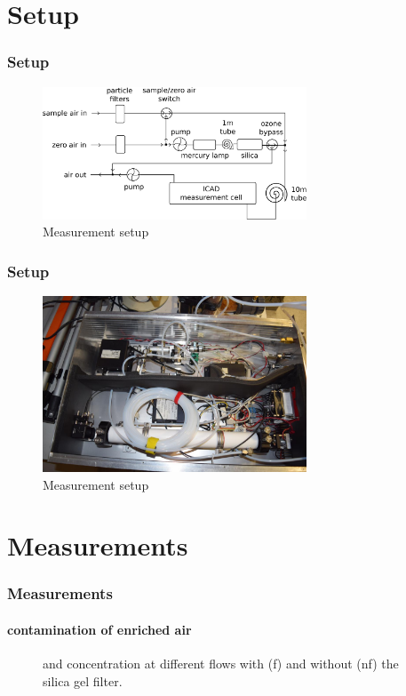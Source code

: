\documentclass[english]{beamer}
\begin{document}
\section{Setup}

\begin{frame}
  \frametitle{Setup}
  \begin{figure}[htbp]
    \centering
    \includegraphics[width=0.7\textwidth]{images/envimes_setup.eps}
    \caption{Measurement setup}
    \label{fig:setup}
  \end{figure}
\end{frame}

\begin{frame}
  \frametitle{Setup}
  \begin{figure}[htbp]
    \centering
    \includegraphics[width=0.7\textwidth]{images/envimes_up.jpg}
    \caption{Measurement setup}
    \label{fig:setup}
  \end{figure}
\end{frame}


\section{Measurements}

\begin{frame}
  \frametitle{Measurements}
  \framesubtitle{ contamination of  enriched air}
  \begin{figure}[htbp]
    \centering
    \scalebox{.7}{
      
    }
    \hspace{1cm}
    \scalebox{.7}{
      
    }
    \caption{ and  concentration at different flows
      with (f) and without (nf) the silica gel filter.}
    \label{fig:flow}
  \end{figure}
\end{frame}
\end{document}
